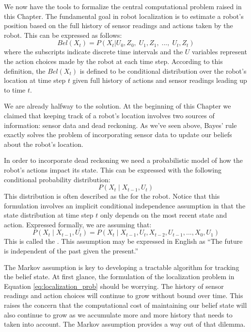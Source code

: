 We now have the tools to formalize the central computational problem
raised in this Chapter.  The fundamental goal in robot localization is
to estimate a robot's position based on the full history of sensor
readings and actions taken by the robot.  This can be expressed as
follows:
\begin{equation}\label{eq:localization_prob}
  Bel(X_t) = P(X_t | U_0, Z_0,\; U_1, Z_1,\; ...,\;U_{t}, Z_{t})
\end{equation}
where the subscripts indicate discrete time intervals and the $U$
variables represent the action choices made by the robot at each time
step.  According to this definition, the  $Bel(X_t)$ is
defined to be conditional distribution over the robot's location at
time step $t$ given full history of actions and sensor readings leading up
to time $t$.

We are already halfway to the solution. At the beginning of this
Chapter we claimed that keeping track of a robot's location involves
two sources of information: sensor data and dead reckoning. As we've
seen above, Bayes' rule exactly solves the problem of incorporating
sensor data to update our beliefs about the robot's location.

In order to incorporate dead reckoning we need a probabilistic model of
how the robot's actions impact its state.  This can be expressed with
the following conditional probability distribution:
\[P(X_t \mid X_{t-1}, U_{t})\]
This distribution is often described as the  for
the robot. Notice that this formulation involves an implicit
conditional independence assumption in that the state distribution at
time step $t$ only depends on the most recent state and
action. Expressed formally, we are assuming that:
\begin{equation}
  P(X_t \mid X_{t-1}, U_{t}) = P(X_t \mid X_{t-1}, U_{t}, X_{t-2}, U_{t-1},..., X_0, U_1)
\end{equation}
This is called the .  This assumption may be
expressed in English as ``The future is independent of the past given
the present.''

The Markov assumption is key to developing a tractable algorithm for
tracking the belief state.  At first glance, the formulation of the
localization problem in Equation \ref{eq:localization_prob} should be
worrying. The history of sensor readings and action choices will
continue to grow without bound over time.  This raises the concern
that the computational cost of maintaining our belief state will also
continue to grow as we accumulate more and more history that needs to
taken into account.  The Markov assumption provides a way out of that
dilemma.


